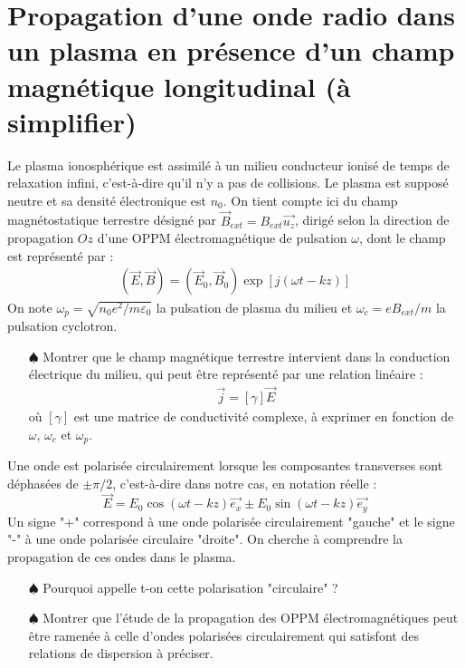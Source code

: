 \documentclass{report}
\begin{document}
\newpage

\section*{Propagation d'une onde radio dans un plasma en présence d'un champ magnétique longitudinal (à simplifier)}

Le plasma ionosphérique est assimilé à un milieu conducteur ionisé de temps de relaxation infini, c'est-à-dire qu'il n'y a pas de collisions. Le plasma est supposé neutre et sa densité électronique est $n_0$. On tient compte ici du champ magnétostatique terrestre désigné par $\vec{B}_{ext}=B_{ext}\vec{u_z}$, dirigé selon la direction de propagation $Oz$ d'une OPPM électromagnétique de pulsation $\omega$, dont le champ est représenté par :
\begin{align*}
	(\vec{E},\vec{B})=(\vec{E}_0,\vec{B}_0)\exp[j(\omega t-kz)]
\end{align*}
On note $\omega_p=\sqrt{n_0e^2/m\varepsilon_0}$ la pulsation de plasma du milieu et $\omega_c=eB_{ext}/m$ la pulsation cyclotron. 

\begin{itemize}
	
	\item[$\spadesuit$] Montrer que le champ magnétique terrestre intervient dans la conduction électrique du milieu, qui peut être représenté par une relation linéaire :
	\begin{align*}
		\vec{j}=\left[\gamma \right] \vec{E}
	\end{align*}
	où $\left[\gamma \right]$ est une matrice de conductivité complexe, à exprimer en fonction de $\omega$, $\omega_c$ et $\omega_p$.
	
\end{itemize}

Une onde est polarisée circulairement lorsque les composantes transverses sont déphasées de $\pm\pi/2$, c'est-à-dire dans notre cas, en notation réelle :
\begin{equation}
	\vec{E}=E_0\cos(\omega t - kz)\vec{e_x}\pm E_0\sin(\omega t - kz)\vec{e_y}
\end{equation}
Un signe "+" correspond à une onde polarisée circulairement "gauche" et le signe "-" à une onde polarisée circulaire "droite". On cherche à comprendre la propagation de ces ondes dans le plasma.

\begin{itemize}

	\item[$\spadesuit$] Pourquoi appelle t-on cette polarisation "circulaire" ? 
	
	\item[$\spadesuit$] Montrer que l'étude de la propagation des OPPM électromagnétiques peut être ramenée à celle d'ondes polarisées circulairement qui satisfont des relations de dispersion à préciser. 
	
\end{itemize}
\end{document}
